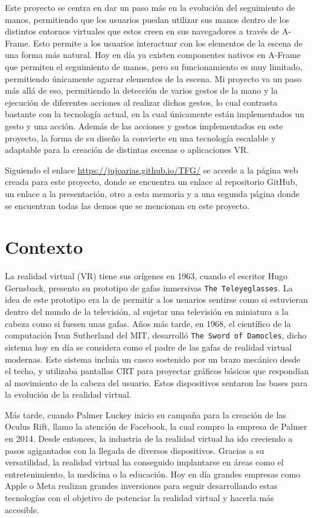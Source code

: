 \documentclass[a4paper, 12pt]{book}
\begin{document}
Este proyecto se centra en dar un paso más en la evolución del seguimiento de manos, permitiendo que los usuarios puedan utilizar sus manos dentro de los distintos entornos virtuales que estos creen en sus navegadores a través de A-Frame. 
Esto permite a los usuarios interactuar con los elementos de la escena de una forma más natural. Hoy en día ya existen componentes nativos en A-Frame que permiten el seguimiento de manos, pero su funcionamiento es muy limitado, permitiendo únicamente agarrar elementos de la escena.
Mi proyecto va un paso más allá de eso, permitiendo la detección de varios gestos de la mano y la ejecución de diferentes acciones al realizar dichos gestos, lo cual contrasta bastante con la tecnología actual, en la cual únicamente están implementados un gesto y una acción.
Además de las acciones y gestos implementados en este proyecto, la forma de su diseño la convierte en una tecnología escalable y adaptable para la creación de distintas escenas o aplicaciones VR. 

Siguiendo el enlace \url{https://jujoarias.github.io/TFG/} se accede a la página web creada para este proyecto, donde se encuentra un enlace al repositorio GitHub, un enlace a la presentación, otro a esta memoria y a una segunda página donde se encuentran todas las demos que se mencionan en este proyecto.\section{Contexto}
\label{sec:contexto}
La realidad virtual (VR) tiene sus orígenes en 1963, cuando el escritor Hugo Gernsback, presento su prototipo de gafas inmersivas \texttt{The Teleyeglasses}. La idea de este prototipo era la de permitir a los usuarios sentirse como si estuvieran dentro del mundo de la televisión, al sujetar una televisión en miniatura a la cabeza como si fuesen unas gafas. Años más tarde, en 1968, el científico de la computación Ivan Sutherland del MIT,
desarrolló \texttt{The Sword of Damocles}, dicho sistema hoy en día se considera como el padre de las gafas de realidad virtual modernas. Este sistema incluía un casco sostenido por un brazo mecánico desde el techo, y utilizaba pantallas CRT para proyectar gráficos básicos que respondían al movimiento de la cabeza del usuario.
Estos dispositivos sentaron las bases para la evolución de la realidad virtual. 

Más tarde, cuando Palmer Luckey inicio su campaña para la creación de las Oculus Rift, llamo la atención de Facebook, la cual compro la empresa de Palmer en 2014. Desde entonces, la industria de la realidad virtual ha ido creciendo a pasos agigantados con la llegada de diversos dispositivos. Gracias a su versatilidad, la realidad virtual ha conseguido implantarse en áreas como el entretenimiento, la medicina o la educación. Hoy en día grandes empresas como Apple o Meta 
realizan grandes inversiones para seguir desarrollando estas tecnologías con el objetivo de potenciar la realidad virtual y hacerla más accesible.  
\end{document}
